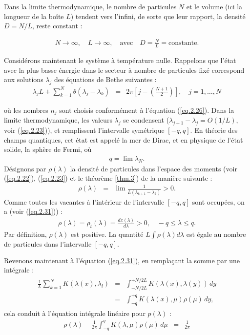 Dans la limite thermodynamique, le nombre de particules \( N \) et le volume (ici la longueur de la boîte \( L \)) tendent vers l'infini, de sorte que leur rapport, la densité \( D = N/L \), reste constant :

\begin{eqnarray}
	N \to \infty, \quad L \to \infty, \quad \text{avec} \quad D = \frac{N}{L} = \text{constante}.	
\end{eqnarray}

Considérons maintenant le système à température nulle. Rappelons que l'état avec la plus basse énergie dans le secteur à nombre de particules fixé correspond aux solutions \( \lambda_j \) des équations de Bethe suivantes :
\begin{eqnarray}
	\lambda_j L + \sum_{k=1}^{N} \theta(\lambda_j - \lambda_k)  & = & 2\pi \left [ j - \left ( \frac{ N +1}{2} \right ) \right ], \quad j=1, \dots, N	
\end{eqnarray}

où les nombres \( n_j \) sont choisis conformément à l'équation (\ref{eq.2.26}). Dans la limite thermodynamique, les valeurs \( \lambda_j \) se condensent (\( \lambda_{j+1} - \lambda_j = O(1/L) \), voir (\ref{eq.2.23})), et remplissent l'intervalle symétrique \( [ -q, q ] \). En théorie des champs quantiques, cet état est appelé la mer de Dirac, et en physique de l'état solide, la sphère de Fermi, où
\begin{eqnarray}
	q = \lim \lambda_N.
\end{eqnarray}
Désignons par \( \rho(\lambda) \) la densité de particules dans l'espace des moments (voir (\ref{eq.2.22}), (\ref{eq.2.23}) et le théorème \ref{thm.3}) de la manière suivante :
\begin{eqnarray}
	\rho(\lambda)  &=  & \lim \frac{1}{L ( \lambda_{k+1} - \lambda_k )} > 0.
\end{eqnarray}
Comme toutes les vacantes à l'intérieur de l'intervalle \( [-q, q] \) sont occupées, on a (voir (\ref{eq.2.31})) :
\begin{eqnarray}
	\rho(\lambda) = \rho_t(\lambda) = \frac{dx(\lambda)}{d\lambda} > 0, \quad -q \leq \lambda \leq q.
\end{eqnarray}
Par définition, \( \rho(\lambda) \) est positive. La quantité \(L \int \rho(\lambda) d\lambda \) est égale au nombre de particules dans l'intervalle \( [-q, q] \).

Revenons maintenant à l'équation (\ref{eq.2.31}), en remplaçant la somme par une intégrale :
\begin{eqnarray}
	\left . \begin{array}{rcl} \displaystyle \frac{1}{L} \sum_{k=1}^{N} K ( \lambda(x) , \lambda_l )  & = & \displaystyle \int_{-N/2L}^{+N/2L} K( \lambda(x) , \lambda( y) ) \, dy \\ & = & \displaystyle \int_{-q}^{+q} K( \lambda(x) , 	\mu ) \rho(\mu)  \, dy, \end{array}\right.
\end{eqnarray}
cela conduit à l'équation intégrale linéaire pour \( p(\lambda) \) :
\begin{eqnarray}
	\rho(\lambda) - \frac{1}{2\pi } \int_{-q}^q K ( \lambda , \mu ) \rho ( \mu ) \, d\mu  & =&  \frac{1}{2\pi} 
\end{eqnarray}


